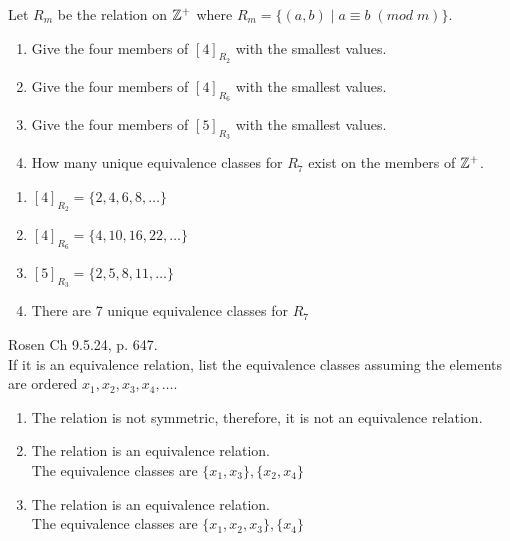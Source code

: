 \begin{questions}
    \ifprintanswers
        \vspace{-5pt}
    \fi
{}  Let $R_m$ be the relation on $\mathbb{Z}^+$ where $R_m = \{ (a,b) \;|\; a \equiv b\; ({mod}\; m )\}$.
\begin{enumerate}[label=(\alph*),itemsep=1pt,topsep=1pt]
	\item Give the four members of $[ 4 ]_{R_2}$ with the smallest values.
	\item Give the four members of $[ 4 ]_{R_6}$ with the smallest values.
	\item Give the four members of $[ 5 ]_{R_3}$ with the smallest values.
	\item How many unique equivalence classes for $R_7$ exist on the members of $\mathbb{Z}^+$.
\end{enumerate}
    \ifprintanswers
        \vspace{-12pt}
    \fi
    \begin{solution}
    \begin{enumerate}[label=(\alph*),itemsep=1pt,topsep=0pt]
    	\item $[ 4 ]_{R_2} = \{ 2, 4, 6, 8 ,\ldots \}$
    	\item $[ 4 ]_{R_6} = \{ 4, 10, 16, 22, \ldots \}$
    	\item $[ 5 ]_{R_3} = \{ 2, 5, 8, 11, \ldots \}$

    	\item There are 7 unique equivalence classes for $R_7$ 
    \end{enumerate}
    \end{solution}



	\ifprintanswers
        \vspace{-10pt}
    \fi
{} Rosen Ch 9.5.24, p. 647.  \\
If it is an equivalence relation, list the equivalence classes assuming the elements are ordered $x_1, x_2, x_3, x_4, \dots$. 
	\ifprintanswers
        \vspace{-15pt}
    \fi
    \begin{solution}
    	\begin{enumerate}[label=(\alph*),itemsep=1pt,topsep=0pt]
    		\item The relation is not symmetric, therefore, it is not an equivalence relation. 
    		\item The relation is an equivalence relation. \\
    		The equivalence classes are $\{x_1, x_3\}, \{x_2, x_4\}$
    		\item The relation is an equivalence relation. \\
    		The equivalence classes are $\{ x_1, x_2, x_3 \}, \{ x_4 \}$
    	\end{enumerate}
    \end{solution}




\end{questions}
